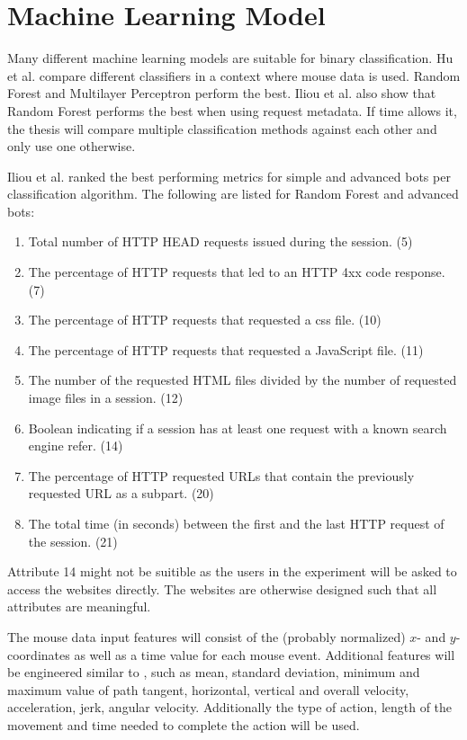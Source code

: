 \documentclass[
    fontsize=12pt,
    headings=small,
    parskip=half,           %
    bibliography=totoc,
    numbers=noenddot,       %
    open=any,               %
    final                   %
    ]{scrreprt}
\begin{document}
\section{Machine Learning Model}

Many different machine learning models are suitable for binary classification. Hu et al. \cite{8275816} compare different classifiers in a context where mouse data is used. Random Forest and Multilayer Perceptron perform the best.
Iliou et al. \cite{10.1145/3339252.3339267} also show that Random Forest performs the best when using request metadata.
If time allows it, the thesis will compare multiple classification methods against each other and only use one otherwise.

Iliou et al. \cite{10.1145/3339252.3339267} ranked the best performing metrics for simple and advanced bots per classification algorithm. The following are listed for Random Forest and advanced bots:

\begin{enumerate}
	\item Total number of HTTP HEAD requests issued during the session. (5)
	\item The percentage of HTTP requests that led to an HTTP 4xx code response. (7)
	\item The percentage of HTTP requests that requested a css file. (10)
	\item The percentage of HTTP requests that requested a JavaScript file. (11)
	\item The number of the requested HTML files divided by the number of requested image files in a session. (12)
	\item Boolean indicating if a session has at least one request with a known search engine refer. (14)
	\item The percentage of HTTP requested URLs that contain the previously requested URL as a subpart. (20)
	\item The total time (in seconds) between the first and the last HTTP request of the session. (21)
\end{enumerate}

Attribute 14 might not be suitible as the users in the experiment will be asked to access the websites directly. The websites are otherwise designed such that all attributes are meaningful.

The mouse data input features will consist of the (probably normalized) $x$- and $y$-coordinates as well as a time value for each mouse event. Additional features will be engineered similar to \cite{DBLP:journals/corr/abs-1810-04668}, such as mean, standard deviation, minimum and maximum value of path tangent, horizontal, vertical and overall velocity, acceleration, jerk, angular velocity. Additionally the type of action, length of the movement and time needed to complete the action will be used.
\end{document}
